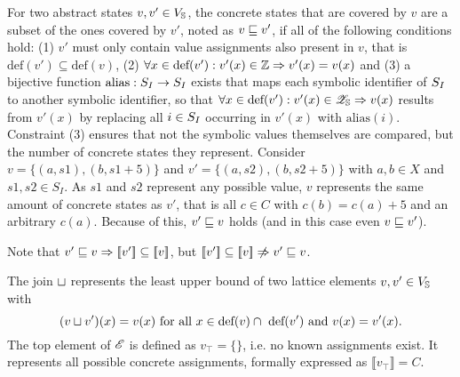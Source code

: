 For two abstract states $v, v' \in V_{\mathbb{S}}$, the concrete states that are covered by $v$ are a subset of the ones covered by $v'$, noted as $v \sqsubseteq v'$, if all of the following conditions hold:
(1) $v'$ must only contain value assignments also present in $v$, that is $\text{def}(v') \subseteq \text{def}(v)$,
(2) $\forall x \in \text{def}(v'): v'(x) \in \mathbb{Z} \Rightarrow v'(x) = v(x)$ and
(3) a bijective function $\text{alias}:S_I \rightarrow S_I$ exists
that maps each symbolic identifier of $S_I$ to another symbolic identifier,
so that $\forall x \in \text{def}(v'): v'(x) \in \mathscr{Z}_{\mathbb{S}} \Rightarrow v(x)$ results from $v'(x)$ by replacing all $i \in S_I$ occurring in $v'(x)$ with $\text{alias}(i)$.
Constraint (3) ensures that not the symbolic values themselves are compared,
but the number of concrete states they represent.
Consider $v = \{ (a, s1), (b, s1 + 5) \}$ and $v' = \{ (a, s2), (b, s2 + 5) \}$ with $a, b \in X$ and $s1, s2 \in S_I$.
As $s1$ and $s2$ represent any possible value, $v$ represents the same amount of concrete states as $v'$, that is all $c \in C$ with $c(b) = c(a) + 5$ and an arbitrary $c(a)$.
Because of this, $v' \sqsubseteq v$ holds (and in this case even $v \sqsubseteq v'$).

Note that $v' \sqsubseteq v \Rightarrow [\![ v' ]\!] \subseteq [\![ v ]\!]$,
but $\llbracket v' \rrbracket \subseteq \llbracket v \rrbracket \centernot\Rightarrow v' \lesserEqual v$.

The join $\sqcup$ represents the least upper bound of two lattice elements $v, v' \in V_{\mathbb{S}}$ with
  \[ (v \sqcup v')(x) = v(x) \text{ for all } x \in \text{def}(v) \cap\ \text{def}(v') \text{ and } v(x) = v'(x) \text{.} \]
The top element of $\mathscr{E}$ is defined as $v_\top = \{\}$, i.e. no known assignments exist. It represents all possible concrete assignments, formally expressed as $\llbracket v_\top \rrbracket = C$.

